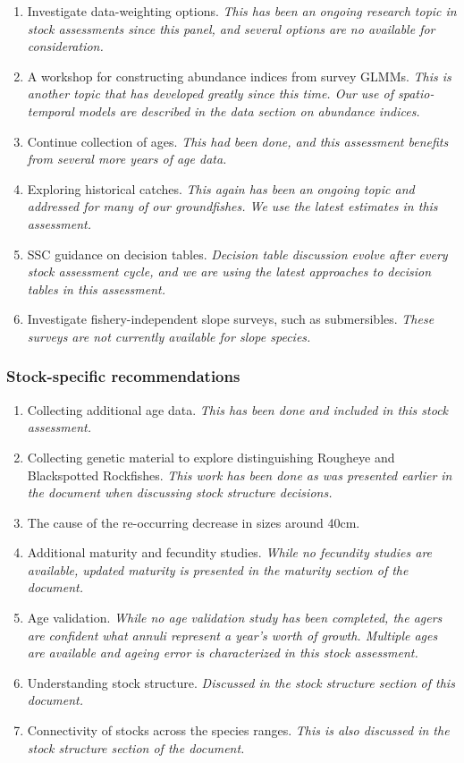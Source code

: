 \documentclass[
]{scrartcl}
\providecommand{\tightlist}{%
  \setlength{\itemsep}{0pt}\setlength{\parskip}{0pt}}\usepackage{longtable,booktabs,array}
\begin{document}
\begin{enumerate}
\def\labelenumi{\arabic{enumi}.}
\tightlist
\item
  Investigate data-weighting options. \emph{This has been an ongoing
  research topic in stock assessments since this panel, and several
  options are no available for consideration.}
\item
  A workshop for constructing abundance indices from survey GLMMs.
  \emph{This is another topic that has developed greatly since this
  time. Our use of spatio-temporal models are described in the data
  section on abundance indices.}
\item
  Continue collection of ages. \emph{This had been done, and this
  assessment benefits from several more years of age data.}
\item
  Exploring historical catches. \emph{This again has been an ongoing
  topic and addressed for many of our groundfishes. We use the latest
  estimates in this assessment.}
\item
  SSC guidance on decision tables. \emph{Decision table discussion
  evolve after every stock assessment cycle, and we are using the latest
  approaches to decision tables in this assessment.}
\item
  Investigate fishery-independent slope surveys, such as submersibles.
  \emph{These surveys are not currently available for slope species.}
\end{enumerate}

\subsubsection{Stock-specific
recommendations}\label{stock-specific-recommendations}

\begin{enumerate}
\def\labelenumi{\arabic{enumi}.}
\tightlist
\item
  Collecting additional age data. \emph{This has been done and included
  in this stock assessment.}
\item
  Collecting genetic material to explore distinguishing Rougheye and
  Blackspotted Rockfishes. \emph{This work has been done as was
  presented earlier in the document when discussing stock structure
  decisions.}
\item
  The cause of the re-occurring decrease in sizes around 40cm.
\item
  Additional maturity and fecundity studies. \emph{While no fecundity
  studies are available, updated maturity is presented in the maturity
  section of the document.}
\item
  Age validation. \emph{While no age validation study has been
  completed, the agers are confident what annuli represent a year's
  worth of growth. Multiple ages are available and ageing error is
  characterized in this stock assessment.}
\item
  Understanding stock structure. \emph{Discussed in the stock structure
  section of this document.}
\item
  Connectivity of stocks across the species ranges. \emph{This is also
  discussed in the stock structure section of the document.}
\end{enumerate}
\end{document}
